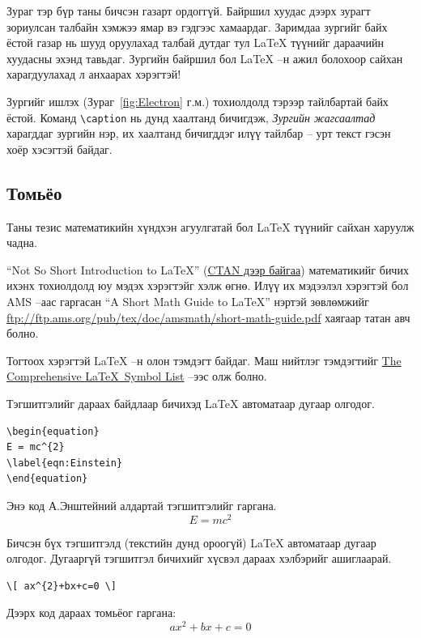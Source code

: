 Зураг тэр бүр таны бичсэн газарт ордоггүй. Байршил хуудас дээрх зурагт зориулсан талбайн хэмжээ ямар вэ гэдгээс хамаардаг. Заримдаа зургийг байх ёстой газар нь шууд оруулахад талбай дутдаг тул \LaTeX{} түүнийг дараачийн хуудасны эхэнд тавьдаг. Зургийн байршил бол \LaTeX{} --н ажил болохоор сайхан харагдуулахад л анхаарах хэрэгтэй!

Зургийг ишлэх (Зураг~\ref{fig:Electron} г.м.) тохиолдолд тэрээр тайлбартай байх ёстой. Команд \verb|\caption| нь дунд хаалтанд бичигдэж, \emph{Зургийн жагсаалтад} харагддаг зургийн нэр, их хаалтанд бичигддэг илүү тайлбар -- урт текст гэсэн хоёр хэсэгтэй байдаг. 

\subsection{Томьёо}

Таны тезис  математикийн хүндхэн агуулгатай бол \LaTeX{} түүнийг сайхан харуулж чадна.

\enquote{Not So Short Introduction to \LaTeX} (\href{http://www.ctan.org/tex-archive/info/lshort/english/lshort.pdf}{CTAN дээр байгаа}) математикийг бичих ихэнх тохиолдолд юу мэдэх хэрэгтэйг хэлж өгнө. Илүү их мэдээлэл хэрэгтэй бол AMS --аас гаргасан \enquote{A Short Math Guide to \LaTeX} нэртэй зөвлөмжийг \url{ftp://ftp.ams.org/pub/tex/doc/amsmath/short-math-guide.pdf} хаягаар татан авч болно.

Тогтоох хэрэгтэй \LaTeX{} --н олон тэмдэгт байдаг. Маш нийтлэг тэмдэгтийг \href{http://ctan.org/pkg/comprehensive}{The Comprehensive \LaTeX~Symbol List} --ээс олж болно.

Тэгшитгэлийг дараах байдлаар бичихэд \LaTeX{} автоматаар дугаар олгодог.
\begin{verbatim}
\begin{equation}
E = mc^{2}
\label{eqn:Einstein}
\end{equation}
\end{verbatim}

Энэ код А.Энштейний алдартай тэгшитгэлийг гаргана.
\begin{equation}
E = mc^{2}
\label{eqn:Einstein}
\end{equation}

Бичсэн бүх тэгшитгэлд (текстийн дунд ороогүй) \LaTeX{} автоматаар дугаар олгодог. Дугааргүй тэгшитгэл бичихийг хүсвэл дараах хэлбэрийг ашиглаарай.

\begin{verbatim}
\[ ax^{2}+bx+c=0 \]
\end{verbatim}
Дээрх код дараах томьёог гаргана:
\[ ax^{2}+bx+c=0 \]


